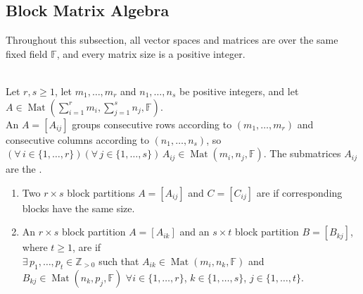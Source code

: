 \subsection{Block Matrix Algebra}
Throughout this subsection, all vector spaces and matrices are over the same fixed field $\mathbb{F}$, and every matrix size is a positive integer.

\begin{definition} \label{def:block-partitions-and-conformality} \\
Let $r,s\geq1$, let $m_1,\ldots,m_r$ and $n_1,\ldots,n_s$ be positive integers, and let $A\in\operatorname{Mat}\!\left(\sum\limits_{i=1}^{r}m_i,\sum\limits_{j=1}^{s}n_j,\mathbb{F}\right)$.\\
An  $A=[A_{ij}]$ groups consecutive rows according to $(m_1,\ldots,m_r)$ and consecutive columns according to $(n_1,\ldots,n_s)$, so $(\forall\,i\in\{1,\ldots,r\})(\forall\,j\in\{1,\ldots,s\})\,A_{ij}\in\operatorname{Mat}(m_i,n_j,\mathbb{F})$. The submatrices $A_{ij}$ are the .
\begin{enumerate}[label=(\roman*)]
\setlength{\itemsep}{0pt}
\item Two $r\times s$ block partitions $A=[A_{ij}]$ and $C=[C_{ij}]$ are  if corresponding blocks have the same size.
\item An $r\times s$ block partition $A=[A_{ik}]$ and an $s\times t$ block partition $B=[B_{kj}]$, where $t\geq1$, are  if\\
$\exists\,p_1,\ldots,p_t\in\mathbb{Z}_{>0}$ such that $A_{ik}\in\operatorname{Mat}(m_i,n_k,\mathbb{F})$ and $B_{kj}\in\operatorname{Mat}(n_k,p_j,\mathbb{F})$ $\forall i\in\{1,\ldots,r\}$, $k\in\{1,\ldots,s\}$, $j\in\{1,\ldots,t\}$.
\end{enumerate}
\end{definition}

